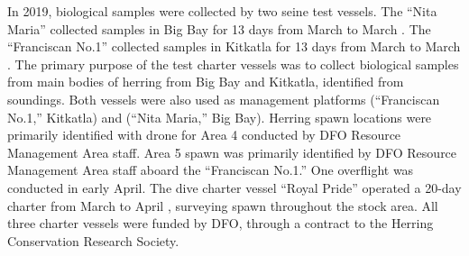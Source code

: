 In 2019, biological samples were collected by two seine test vessels.
The ``Nita Maria'' collected samples in Big Bay for 13 days from March  to March .
The ``Franciscan No.1'' collected samples in Kitkatla for 13 days from March  to March .
The primary purpose of the test charter vessels was to collect biological samples from main bodies of herring from Big Bay and Kitkatla, identiﬁed from soundings.
Both vessels were also used as management platforms (``Franciscan No.1,'' Kitkatla) and (``Nita Maria,'' Big Bay). 
Herring spawn locations were primarily identiﬁed with drone for Area 4 conducted by DFO Resource Management Area staff.
Area 5 spawn was primarily identified by DFO Resource Management Area staff aboard the ``Franciscan No.1.''
One overflight was conducted in early April.
The dive charter vessel ``Royal Pride'' operated a 20-day charter from March  to April , surveying spawn throughout the stock area.
All three charter vessels were funded by DFO, through a contract to the Herring Conservation Research Society.